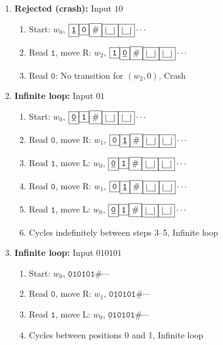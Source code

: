 \documentclass[12pt,a4paper,openany]{article}
\begin{document}
\begin{enumerate}
\item \textbf{Rejected (crash):} Input $10$

\begin{enumerate}
\item Start: $w_0$, $\boxed{\underline{\mathtt{1}}}\boxed{\mathtt{0}}\boxed{\#}\boxed{\scalebox{2.5}{\textvisiblespace}}\boxed{\scalebox{2.5}{\textvisiblespace}}\cdots$
\item Read $\mathtt{1}$, move R: $w_2$, $\boxed{\mathtt{1}}\boxed{\underline{\mathtt{0}}}\boxed{\#}\boxed{\scalebox{2.5}{\textvisiblespace}}\boxed{\scalebox{2.5}{\textvisiblespace}}\cdots$
\item Read $\mathtt{0}$: No transition for $(w_2, 0)$, Crash
\end{enumerate}

\item \textbf{Infinite loop:} Input $01$

\begin{enumerate}
\item Start: $w_0$, $\boxed{\underline{\mathtt{0}}}\boxed{\mathtt{1}}\boxed{\#}\boxed{\scalebox{2.5}{\textvisiblespace}}\boxed{\scalebox{2.5}{\textvisiblespace}}\cdots$
\item Read $\mathtt{0}$, move R: $w_1$, $\boxed{\mathtt{0}}\boxed{\underline{\mathtt{1}}}\boxed{\#}\boxed{\scalebox{2.5}{\textvisiblespace}}\boxed{\scalebox{2.5}{\textvisiblespace}}\cdots$
\item Read $\mathtt{1}$, move L: $w_0$, $\boxed{\underline{\mathtt{0}}}\boxed{\mathtt{1}}\boxed{\#}\boxed{\scalebox{2.5}{\textvisiblespace}}\boxed{\scalebox{2.5}{\textvisiblespace}}\cdots$
\item Read $\mathtt{0}$, move R: $w_1$, $\boxed{\mathtt{0}}\boxed{\underline{\mathtt{1}}}\boxed{\#}\boxed{\scalebox{2.5}{\textvisiblespace}}\boxed{\scalebox{2.5}{\textvisiblespace}}\cdots$
\item Read $\mathtt{1}$, move L: $w_0$, $\boxed{\underline{\mathtt{0}}}\boxed{\mathtt{1}}\boxed{\#}\boxed{\scalebox{2.5}{\textvisiblespace}}\boxed{\scalebox{2.5}{\textvisiblespace}}\cdots$
\item Cycles indefinitely between steps 3–5, Infinite loop
\end{enumerate}

\item \textbf{Infinite loop:} Input $010101$

\begin{enumerate}
\item Start: $w_0$, $\boxed{\underline{\mathtt{0}}}\boxed{\mathtt{1}}\boxed{\mathtt{0}}\boxed{\mathtt{1}}\boxed{\mathtt{0}}\boxed{\mathtt{1}}\boxed{\#}\cdots$
\item Read $\mathtt{0}$, move R: $w_1$, $\boxed{\mathtt{0}}\boxed{\underline{\mathtt{1}}}\boxed{\mathtt{0}}\boxed{\mathtt{1}}\boxed{\mathtt{0}}\boxed{\mathtt{1}}\boxed{\#}\cdots$
\item Read $\mathtt{1}$, move L: $w_0$, $\boxed{\underline{\mathtt{0}}}\boxed{\mathtt{1}}\boxed{\mathtt{0}}\boxed{\mathtt{1}}\boxed{\mathtt{0}}\boxed{\mathtt{1}}\boxed{\#}\cdots$
\item Cycles between positions 0 and 1, Infinite loop
\end{enumerate}


\end{enumerate}
\end{document}
